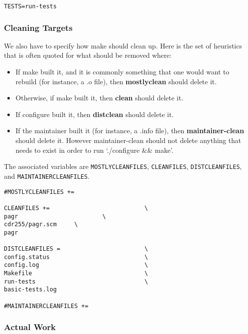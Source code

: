\documentclass[11pt]{article}
\begin{document}
\begin{verbatim}
TESTS=run-tests
\end{verbatim}
\subsubsection{Cleaning Targets}
\label{sec:orgd52e549}
We also have to specify how make should clean up. Here is the set of heuristics
that is often quoted for what should be removed where:

\begin{itemize}
\item If make built it, and it is commonly something that one would want to
rebuild (for instance, a .o file), then \textbf{mostlyclean} should delete it.
\item Otherwise, if make built it, then \textbf{clean} should delete it.
\item If configure built it, then \textbf{distclean} should delete it.
\item If the maintainer built it (for instance, a .info file), then
\textbf{maintainer-clean} should delete it. However maintainer-clean should not
delete anything that needs to exist in order to run ‘./configure \&\& make’.
\end{itemize}


The associated variables are \texttt{MOSTLYCLEANFILES}, \texttt{CLEANFILES}, \texttt{DISTCLEANFILES},
and \texttt{MAINTAINERCLEANFILES}.
\begin{verbatim}
#MOSTLYCLEANFILES +=                    

CLEANFILES +=                           \
pagr                        \
cdr255/pagr.scm     \
pagr

DISTCLEANFILES =                        \
config.status                           \
config.log                              \
Makefile                                \
run-tests                               \
basic-tests.log

#MAINTAINERCLEANFILES +=                 

\end{verbatim}
\subsubsection{Actual Work}
\label{sec:orga047b94}
\end{document}
